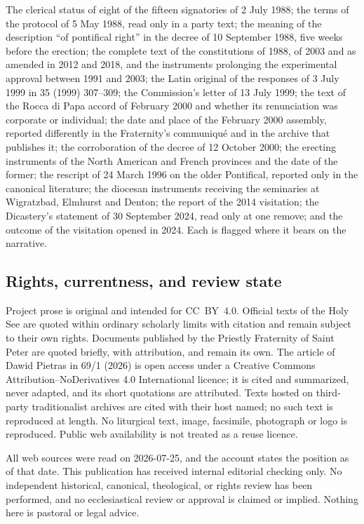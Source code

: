 The clerical status of eight of the fifteen signatories of 2 July 1988;
the terms of the protocol of 5 May 1988, read only in a party text; the
meaning of the description ``of pontifical right'' in the decree of 10
September 1988, five weeks before the erection; the complete text of the
constitutions of 1988, of 2003 and as amended in 2012 and 2018, and the
instruments prolonging the experimental approval between 1991 and 2003;
the Latin original of the responses of 3 July 1999 in  35
(1999) 307--309; the Commission's letter of 13 July 1999; the text of the
Rocca di Papa accord of February 2000 and whether its renunciation was
corporate or individual; the date and place of the February 2000 assembly,
reported differently in the Fraternity's communiqué and in the archive
that publishes it; the corroboration of the decree of 12 October 2000; the
erecting instruments of the North American and French provinces and the
date of the former; the rescript of 24 March 1996 on the older Pontifical,
reported only in the canonical literature; the diocesan instruments
receiving the seminaries at Wigratzbad, Elmhurst and Denton; the report of
the 2014 visitation; the Dicastery's statement of 30 September 2024, read
only at one remove; and the outcome of the visitation opened in 2024. Each
is flagged where it bears on the narrative.

\subsection{Rights, currentness, and review state}

Project prose is original and intended for CC~BY~4.0. Official texts of
the Holy See are quoted within ordinary scholarly limits with citation and
remain subject to their own rights. Documents published by the Priestly
Fraternity of Saint Peter are quoted briefly, with attribution, and remain
its own. The article of Dawid Pietras in  69/1
(2026) is open access under a Creative Commons Attribution--NoDerivatives
4.0 International licence; it is cited and summarized, never adapted, and
its short quotations are attributed. Texts hosted on third-party
traditionalist archives are cited with their host named; no such text is
reproduced at length. No liturgical text, image, facsimile, photograph or
logo is reproduced. Public web availability is not treated as a reuse
licence.

All web sources were read on 2026-07-25, and the account states the
position as of that date. This publication has received internal editorial
checking only. No independent historical, canonical, theological, or
rights review has been performed, and no ecclesiastical review or approval
is claimed or implied. Nothing here is pastoral or legal advice.

